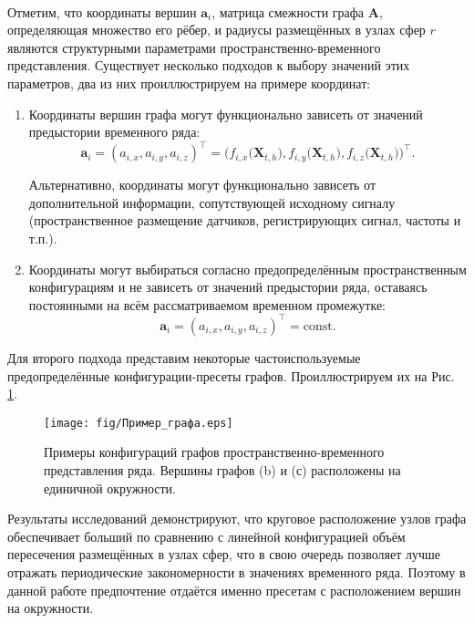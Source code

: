 \documentclass[12pt]{article}
\begin{document}
\paragraph{}
Отметим, что координаты вершин $\mathbf{a}_i$, матрица смежности графа $\textbf{A}$, определяющая множество его рёбер, и радиусы размещённых в узлах сфер $r$ являются структурными параметрами пространственно-временного представления. Существует несколько подходов к выбору значений этих параметров, два из них проиллюстрируем на примере координат:
\begin{enumerate}
    \item Координаты вершин графа могут функционально зависеть от значений предыстории временного ряда:
    $$ \mathbf{a}_i = (a_{i,x}, a_{i,y}, a_{i,z})^\intercal = \Bigg(f_{i,x}\Big(\textbf{X}_{t,h} \Big), f_{i,y}\Big(\textbf{X}_{t,h} \Big), f_{i,z}\Big(\textbf{X}_{t,h} \Big) \Bigg)^\intercal.$$
    
    Альтернативно, координаты могут функционально зависеть от дополнительной информации, сопутствующей исходному сигналу (пространственное размещение датчиков, регистрирующих сигнал, частоты и т.п.).
    \item Координаты могут выбираться согласно предопределённым пространственным конфигурациям и не зависеть от значений предыстории ряда, оставаясь постоянными на всём рассматриваемом временном промежутке:
    $$ \mathbf{a}_i = (a_{i,x}, a_{i,y}, a_{i,z})^\intercal = \text{const}.$$
\end{enumerate}

\noindent
Для второго подхода представим некоторые частоиспользуемые предопределённые конфигурации-пресеты графов. Проиллюстрируем их на Рис. \ref{fig:graph_example}.

\hspace{1.5cm}

\begin{figure}[h]
    \centering
    \texttt{[image: fig/Пример\_графа.eps]}
    \caption{Примеры конфигураций графов пространственно-временного представления ряда. Вершины графов (b) и (с) расположены на единичной окружности.}
    \label{fig:graph_example}
\end{figure}

Результаты исследований \cite{Thiruvengadam2020} демонстрируют, что круговое расположение узлов графа обеспечивает больший по сравнению с линейной конфигурацией объём пересечения размещённых в узлах сфер, что в свою очередь позволяет лучше отражать периодические закономерности в значениях временного ряда. Поэтому в данной работе предпочтение отдаётся именно пресетам с расположением вершин на окружности.
\end{document}
